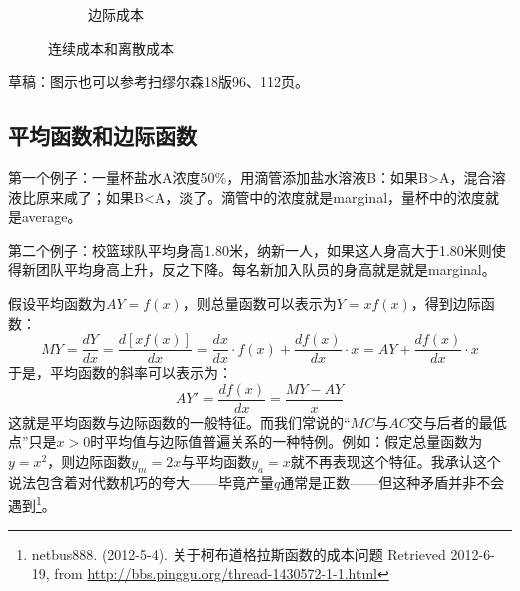 \begin{figure}[!h]
{{\begin{subfigure}[b]{0.5\textwidth}
\caption{边际成本}
\label{fig:continuous-vs-constant-marginalcosts-curves}%
\end{subfigure}%
\caption[总成本与边际成本：连续函数与离散函数]{连续成本和离散成本}
\label{fig:continuous-vs-constant-costs-curves}%
}}
\end{figure}

草稿：图示也可以参考扫缪尔森18版96、112页。

\subsection*{平均函数和边际函数}
\label{sec:average-and-marginal-function}

第一个例子：一量杯盐水A浓度50\%，用滴管添加盐水溶液B：如果B>A，混合溶液比原来咸了；如果B<A，淡了。滴管中的浓度就是marginal，量杯中的浓度就是average。

第二个例子：校篮球队平均身高1.80米，纳新一人，如果这人身高大于1.80米则使得新团队平均身高上升，反之下降。每名新加入队员的身高就是就是marginal。

假设平均函数为$AY=f(x)$，则总量函数可以表示为$Y=xf(x)$，得到边际函数：
\[MY = \frac{{dY}}{{dx}} = \frac{{d[xf(x)]}}{{dx}} = \frac{{dx}}{{dx}}\cdot f(x) + \frac{{df(x)}}{{dx}}\cdot x = AY + \frac{{df(x)}}{{dx}}\cdot x\]
于是，平均函数的斜率可以表示为：
\begin{equation}
AY' = \frac{df(x)}{dx} = \frac{MY - AY}{x}
\end{equation}
这就是平均函数与边际函数的一般特征。而我们常说的“$MC$与$AC$交与后者的最低点”只是$x>0$时平均值与边际值普遍关系的一种特例。例如：假定总量函数为$y=x^2$，则边际函数$y_m = 2x$与平均函数$y_a = x$就不再表现这个特征。我承认这个说法包含着对代数机巧的夸大——毕竟产量$q$通常是正数——但这种矛盾并非不会遇到\footnote{%
netbus888. (2012-5-4). 关于柯布道格拉斯函数的成本问题  Retrieved 2012-6-19, from {\url{http://bbs.pinggu.org/thread-1430572-1-1.html}}}。

